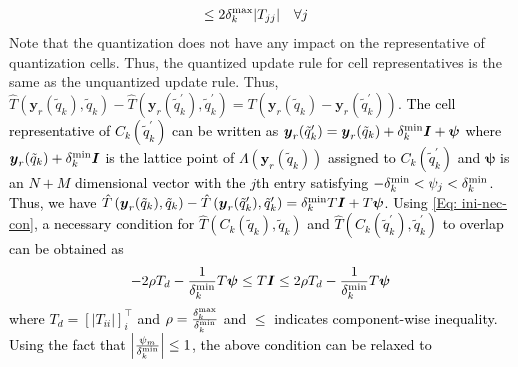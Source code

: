 \documentclass[10pt,twocolumn,twoside]{IEEEtran}
\begin{document}
\begin{IEEEproof}
{\begin{align}
& \leq 2\delta^{\rm max}_k{\left|{T_{jj}}\right|}  \quad \forall j
\end{align}
Note that the quantization does not have any impact on the  representative of quantization cells. Thus, the quantized update rule for cell representatives is the same as the unquantized update rule. Thus, ${\ensuremath{\hat{T}\left({{\ensuremath{\boldsymbol{{y}}}}_r{\left({\tilde{q}_k}\right)}},{\tilde{q}_k}\right)}}-{\ensuremath{\hat{T}\left({{\ensuremath{\boldsymbol{{y}}}}_r{\left({\tilde{q}^\prime_k}\right)}},{\tilde{q}^\prime_k}\right)}}=T{\left({{\ensuremath{\boldsymbol{{y}}}}_r{\left({\tilde{q}_k}\right)}-{\ensuremath{\boldsymbol{{y}}}}_r{\left({\tilde{q}^\prime_k}\right)}}\right)}$.
}
\textcolor{black}{ The cell representative of $C_k{\left({\tilde{q}^\prime_k}\right)}$ can be written as ${\ensuremath{\boldsymbol{{y}}}}_r{\left({\tilde{q}^\prime_k}\right)}={\ensuremath{\boldsymbol{{y}}}}_r{\left({\tilde{q}_k}\right)}+\delta^{\rm min}_k{\ensuremath{\boldsymbol{{I}}}}+{\ensuremath{\boldsymbol{{\psi}}}}$ where ${\ensuremath{\boldsymbol{{y}}}}_r{\left({\tilde{q}_k}\right)}+\delta^{\rm min}_k{\ensuremath{\boldsymbol{{I}}}}$ is the lattice point of $\Lambda{\left({{\ensuremath{\boldsymbol{{y}}}}_r{\left({\tilde{q}_k}\right)}}\right)}$  assigned to $C_k{\left({\tilde{q}^\prime_k}\right)}$ and ${\ensuremath{\boldsymbol{{\psi}}}}$ is an $N+M$ dimensional vector with the $j$th entry satisfying $-\delta^{\rm min}_k< \psi_j<\delta^{\rm min}_k$. Thus, we have ${\ensuremath{\hat{T}\left({{\ensuremath{\boldsymbol{{y}}}}_r{\left({\tilde{q}_k}\right)}},{\tilde{q}_k}\right)}}-{\ensuremath{\hat{T}\left({{\ensuremath{\boldsymbol{{y}}}}_r{\left({\tilde{q}^\prime_k}\right)}},{\tilde{q}^\prime_k}\right)}}=\delta^{\rm min}_kT{\ensuremath{\boldsymbol{{I}}}}+T{\ensuremath{\boldsymbol{{\psi}}}}$.
Using \eqref{Eq: ini-nec-con}, a necessary condition for ${\ensuremath{\hat{T}\left({C_k{\left({\tilde{q}_k}\right)}},{\tilde{q}_k}\right)}}$ and ${\ensuremath{\hat{T}\left({C_k{\left({\tilde{q}^\prime_k}\right)}},{\tilde{q}^\prime_k}\right)}}$ to overlap can be obtained as 
\begin{align}
-2\rho T_d-\frac{1}{\delta^{\rm min}_k}T{\ensuremath{\boldsymbol{{\psi}}}}\leq T{\ensuremath{\boldsymbol{{I}}}}\leq2\rho T_d-\frac{1}{\delta^{\rm min}_k}T{\ensuremath{\boldsymbol{{\psi}}}}\nonumber
\end{align}
where $T_d=\left[{\left|{T_{ii}}\right|}\right]_i^\top$ and $\rho=\frac{\delta^{\rm max}_k}{\delta^{\rm min}_k}$ and $\leq$ indicates component-wise inequality. Using the fact that ${\left|{\frac{{\psi}_m}{\delta^{\rm min}_k}}\right|}\leq 1$, the above condition can be relaxed to 
}
\end{IEEEproof}
\end{document}

